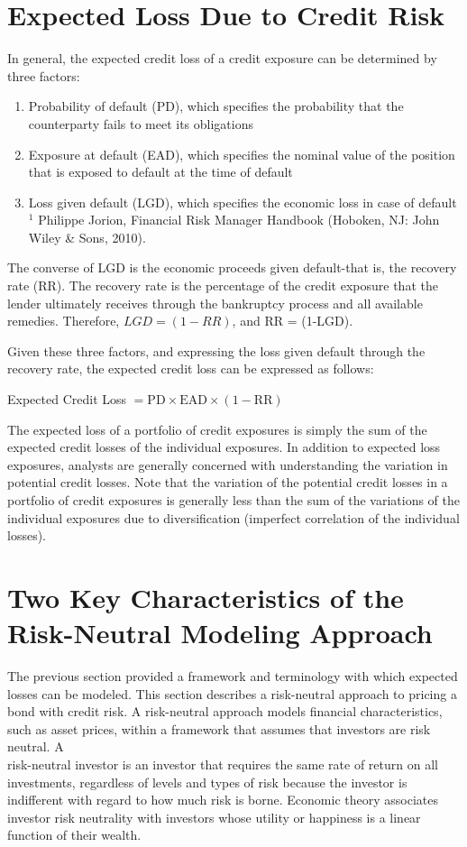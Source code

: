 \documentclass[11pt]{article}
\begin{document}
\section*{Expected Loss Due to Credit Risk}
In general, the expected credit loss of a credit exposure can be determined by three factors:

\begin{enumerate}
  \item Probability of default (PD), which specifies the probability that the counterparty fails to meet its obligations

  \item Exposure at default (EAD), which specifies the nominal value of the position that is exposed to default at the time of default

  \item Loss given default (LGD), which specifies the economic loss in case of default ${ }^{1}$ Philippe Jorion, Financial Risk Manager Handbook (Hoboken, NJ: John Wiley \& Sons, 2010).

\end{enumerate}

The converse of LGD is the economic proceeds given default-that is, the recovery rate (RR). The recovery rate is the percentage of the credit exposure that the lender ultimately receives through the bankruptcy process and all available remedies. Therefore, $L G D=(1-R R)$, and RR = (1-LGD).

Given these three factors, and expressing the loss given default through the recovery rate, the expected credit loss can be expressed as follows:

Expected Credit Loss $=\mathrm{PD} \times \mathrm{EAD} \times(1-\mathrm{RR})$

The expected loss of a portfolio of credit exposures is simply the sum of the expected credit losses of the individual exposures. In addition to expected loss exposures, analysts are generally concerned with understanding the variation in potential credit losses. Note that the variation of the potential credit losses in a portfolio of credit exposures is generally less than the sum of the variations of the individual exposures due to diversification (imperfect correlation of the individual losses).

\section*{Two Key Characteristics of the Risk-Neutral Modeling Approach}
The previous section provided a framework and terminology with which expected losses can be modeled. This section describes a risk-neutral approach to pricing a bond with credit risk. A risk-neutral approach models financial characteristics, such as asset prices, within a framework that assumes that investors are risk neutral. A\\
risk-neutral investor is an investor that requires the same rate of return on all investments, regardless of levels and types of risk because the investor is indifferent with regard to how much risk is borne. Economic theory associates investor risk neutrality with investors whose utility or happiness is a linear function of their wealth.
\end{document}
